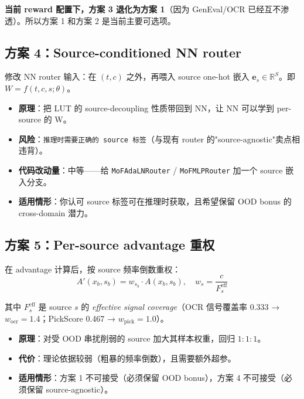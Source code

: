 \documentclass[11pt,a4paper]{article}
\newcommand{\R}{\mathbb{R}}
\begin{document}
\textbf{当前 reward 配置下，方案 3 退化为方案 1}（因为 GenEval/OCR 已经互不渗透）。所以方案 1 和方案 2 是当前主要可选项。

\subsection{方案 4：Source-conditioned NN router}

修改 NN router 输入：在 $(t, c)$ 之外，再喂入 source one-hot 嵌入 $\mathbf{e}_s \in \R^S$。即 $W = f(t, c, s; \theta)$。

\begin{itemize}
    \item \textbf{原理}：把 LUT 的 source-decoupling 性质带回到 NN，让 NN 可以学到 per-source 的 W。
    \item \textbf{风险}：\texttt{推理时需要正确的 source 标签}（与现有 router 的"source-agnostic"卖点相违背）。
    \item \textbf{代码改动量}：中等——给 \texttt{MoFAdaLNRouter} / \texttt{MoFMLPRouter} 加一个 source 嵌入分支。
    \item \textbf{适用情形}：你认可 source 标签可在推理时获取，且希望保留 OOD bonus 的 cross-domain 潜力。
\end{itemize}

\subsection{方案 5：Per-source advantage 重权}

在 advantage 计算后，按 source 频率倒数重权：
\begin{equation}
A'(x_b, s_b) = w_{s_b} \cdot A(x_b, s_b), \quad w_s = \frac{c}{F_s^{\text{eff}}}
\end{equation}

其中 $F_s^{\text{eff}}$ 是 source $s$ 的 \emph{effective signal coverage}（OCR 信号覆盖率 0.333 → $w_{\text{ocr}} = 1.4$；PickScore 0.467 → $w_{\text{pick}} = 1.0$）。

\begin{itemize}
    \item \textbf{原理}：对受 OOD 串扰削弱的 source 加大其样本权重，回归 $1{:}1{:}1$。
    \item \textbf{代价}：理论依据较弱（粗暴的频率倒数），且需要额外超参。
    \item \textbf{适用情形}：方案 1 不可接受（必须保留 OOD bonus），方案 4 不可接受（必须保留 source-agnostic）。
\end{itemize}
\end{document}
